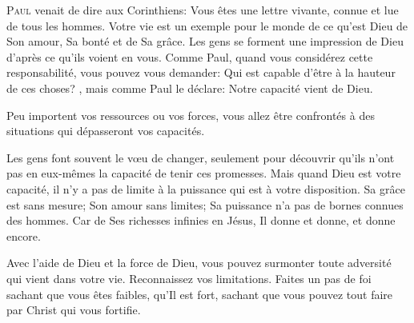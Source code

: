 \jrnlmonth





\lettrine{P}{aul} venait de dire aux Corinthiens: 
 \Og Vous êtes une lettre vivante, connue et lue de tous les hommes. \Fg{}
 Votre vie est un exemple pour le monde de ce qu'est Dieu \ocadr de Son amour,
 Sa bonté et de Sa grâce.
 Les gens se forment une impression de Dieu d'après ce qu'ils voient en vous.
 Comme Paul, quand vous considérez cette responsabilité, 
 vous pouvez vous demander: 
 \Og Qui est capable d'être à la hauteur de ces choses? \Fg{},
 mais  comme Paul le déclare: 
 \Og Notre capacité vient de Dieu. \Fg{}

Peu importent vos ressources ou vos forces,
 vous allez être confrontés à des situations qui dépasseront vos capacités.


Les gens font souvent le v\oe{}u de changer, seulement pour découvrir
 qu'ils n'ont pas en eux-mêmes la capacité de tenir ces promesses.
 Mais quand Dieu est votre capacité, il n'y a pas de limite à la puissance
 qui est à votre disposition.
 Sa grâce est sans mesure; Son amour sans limites;
 Sa puissance n'a pas de bornes connues des hommes.
 Car de Ses richesses infinies en Jésus, Il donne et donne, et donne encore.

Avec l'aide de Dieu et la force de Dieu, vous pouvez surmonter
 toute adversité qui vient dans votre vie. Reconnaissez vos limitations.
 Faites un pas de foi sachant que vous êtes faibles, qu'Il est fort,
 sachant que vous pouvez tout faire par Christ qui vous fortifie.

\dvrule



